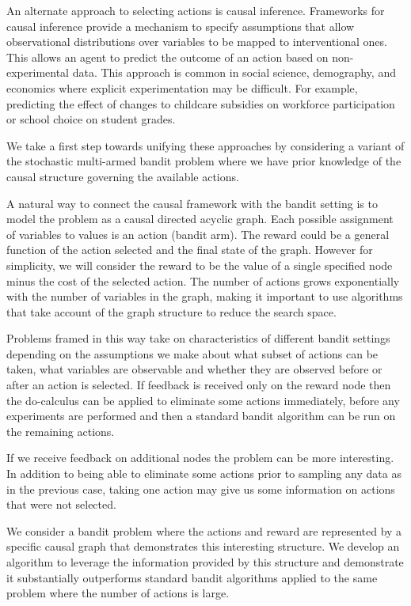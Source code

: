 \documentclass{article}
\makeatletter
\newcommand{\tinytodo}[2][]{\todo[size=\tiny]{#2}}
\newcommand{\todom}[2][]{\tinytodo[color=green!20, #1]{M:\@#2}} %
\theoremstyle{plain}
\theoremstyle{definition}
\makeatother
\begin{document}
An alternate approach to selecting actions is causal inference. Frameworks for causal inference provide a mechanism to specify assumptions that allow observational distributions over variables to be mapped to interventional ones. This allows an agent to predict the outcome of an action based on non-experimental data. This approach is common in social science, demography, and economics where explicit experimentation may be difficult. For example, predicting the effect of changes to childcare subsidies on workforce participation or school choice on student grades. 

We take a first step towards unifying these approaches by considering a variant of the stochastic multi-armed bandit problem where we have prior knowledge of the causal structure governing the available actions. 

\todom{Summarise results \& give intuition for algorithm}

A natural way to connect the causal framework with the bandit setting is to model the problem as a causal directed acyclic graph. Each possible assignment of variables to values is an action (bandit arm). The reward could be a general function of the action selected and the final state of the graph. However for simplicity, we will consider the reward to be the value of a single specified node minus the cost of the selected action. The number of actions grows exponentially with the number of variables in the graph, making it important to use algorithms that take account of the graph structure to reduce the search space. 

Problems framed in this way take on characteristics of different bandit settings depending on the assumptions we make about what subset of actions can be taken, what variables are observable and whether they are observed before or after an action is selected. If feedback is received only on the reward node then the do-calculus can be applied to eliminate some actions immediately, before any experiments are performed and then a standard bandit algorithm can be run on the remaining actions. 

If we receive feedback on additional nodes the problem can be more interesting. In addition to being able to eliminate some actions prior to sampling any data as in the previous case, taking one action may give us some information on actions that were not selected. 

We consider a bandit problem where the actions and reward are represented by a specific causal graph that demonstrates this interesting structure. We develop an algorithm to leverage the information provided by this structure and demonstrate it substantially outperforms standard bandit algorithms applied to the same problem where the number of actions is large.
\end{document}
